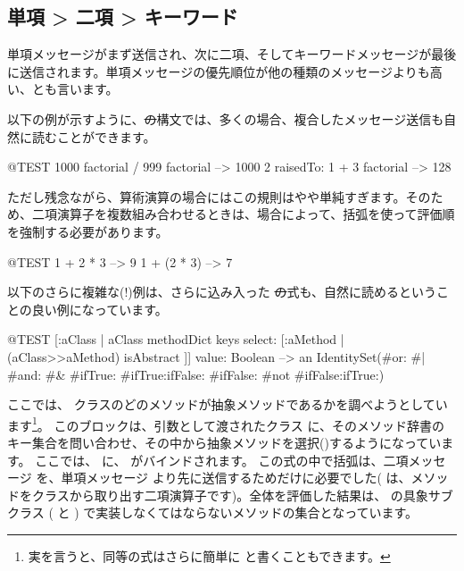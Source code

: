 \documentclass[a4paper,10pt,twoside]{book}
\begin{document}
\subsection*{単項 > 二項 > キーワード}
単項メッセージがまず送信され、次に二項、そしてキーワードメッセージが最後に送信されます。単項メッセージの優先順位が他の種類のメッセージよりも高い、とも言います。


以下の例が示すように、\st の構文では、多くの場合、複合したメッセージ送信も自然に読むことができます。
\begin{code}{@TEST}
1000 factorial / 999 factorial --> 1000
2 raisedTo: 1 + 3 factorial     --> 128
\end{code}
\noindent

ただし残念ながら、算術演算の場合にはこの規則はやや単純すぎます。そのため、二項演算子を複数組み合わせるときは、場合によって、括弧を使って評価順を強制する必要があります。
\begin{code}{@TEST}
1 + 2 * 3   --> 9
1 + (2 * 3) --> 7
\end{code}

以下のさらに複雑な(!)例は、さらに込み入った \st の式も、自然に読めるということの良い例になっています。
\begin{code}{@TEST}
[:aClass | aClass methodDict keys select: [:aMethod | (aClass>>aMethod) isAbstract ]] value: Boolean --> an IdentitySet(#or: #| #and: #& #ifTrue: #ifTrue:ifFalse: #ifFalse: #not #ifFalse:ifTrue:)
\end{code}
\noindent
ここでは、 クラスのどのメソッドが抽象メソッドであるかを調べようとしています\footnote{実を言うと、同等の式はさらに簡単に  と書くこともできます。}。
このブロックは、引数として渡されたクラス  に、そのメソッド辞書のキー集合を問い合わせ、その中から抽象メソッドを選択()するようになっています。
ここでは、 に、 がバインドされます。
この式の中で括弧は、二項メッセージ \ct{>>} を、単項メッセージ \mbox{} より先に送信するためだけに必要でした(\ct{>>} は、メソッドをクラスから取り出す二項演算子です)。全体を評価した結果は、 の具象サブクラス ( と ) で実装しなくてはならないメソッドの集合となっています。
\end{document}
